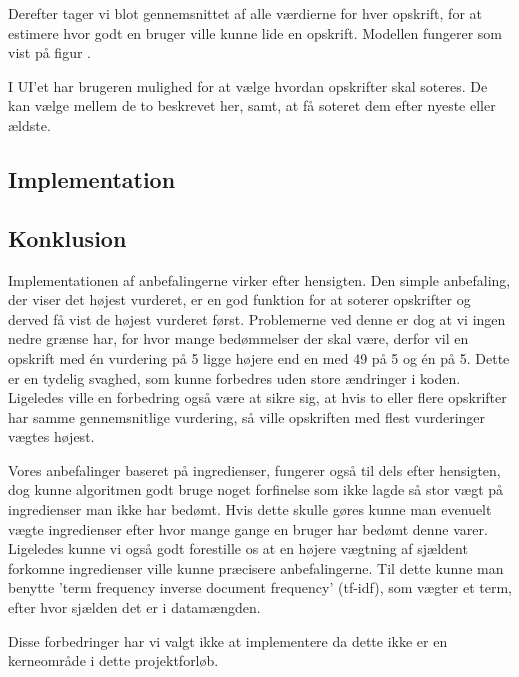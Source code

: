 Derefter tager vi blot gennemsnittet af alle værdierne for hver opskrift, for at estimere hvor godt en bruger ville kunne lide en opskrift.
Modellen fungerer som vist på figur .


I UI’et har brugeren mulighed for at vælge hvordan opskrifter skal soteres.
De kan vælge mellem de to beskrevet her, samt, at få soteret dem efter nyeste eller ældste.

\subsection{Implementation}


\subsection{Konklusion}
Implementationen af anbefalingerne virker efter hensigten.
Den simple anbefaling, der viser det højest vurderet, er en god funktion for at soterer opskrifter og derved få vist de højest vurderet først.
Problemerne ved denne er dog at vi ingen nedre grænse har, for hvor mange bedømmelser der skal være, derfor vil en opskrift med én vurdering på 5 ligge højere end en med 49 på 5 og én på 5.
Dette er en tydelig svaghed, som kunne forbedres uden store ændringer i koden.
Ligeledes ville en forbedring også være at sikre sig, at hvis to eller flere opskrifter har samme gennemsnitlige vurdering, så ville opskriften med flest vurderinger vægtes højest.

Vores anbefalinger baseret på ingredienser, fungerer også til dels efter hensigten, dog kunne algoritmen godt bruge noget forfinelse som ikke lagde så stor vægt på ingredienser man ikke har bedømt.
Hvis dette skulle gøres kunne man evenuelt vægte ingredienser efter hvor mange gange en bruger har bedømt denne varer.
Ligeledes kunne vi også godt forestille os at en højere vægtning af sjældent forkomne ingredienser ville kunne præcisere anbefalingerne.
Til dette kunne man benytte 'term frequency inverse document frequency' (tf-idf), som vægter et term, efter hvor sjælden det er i datamængden.

Disse forbedringer har vi valgt ikke at implementere da dette ikke er en kerneområde i dette projektforløb.
